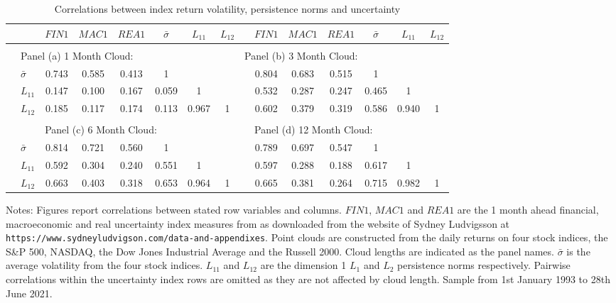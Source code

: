 \documentclass{article}
\begin{document}
\begin{table}
	\begin{center}
		\caption{Correlations between index return volatility, persistence norms and uncertainty}
		\label{tab:corunc}
		\begin{tabular}{l l c c c c c c c c c  c c c c}
			\hline
			&& $FIN1$ & $MAC1$ & $REA1$ & $\bar{\sigma}$ & $L_{11}$ & $L_{12}$ && $FIN1$ & $MAC1$ & $REA1$ & $\bar{\sigma}$ & $L_{11}$ & $L_{12}$\\
			\hline
			&&&&&&&&&&\\
			& \multicolumn{6}{l}{Panel (a) 1 Month Cloud:} && \multicolumn{6}{l}{Panel (b) 3 Month Cloud:}\\ &$\bar{\sigma}$ & 0.743&0.585&0.413&1&&&&0.804&0.683&0.515&1&&\\
			& $L_{11}$ & 0.147&0.100&0.167&0.059&1&&&0.532&0.287&0.247&0.465&1&\\
			&$L_{12}$&0.185&0.117&0.174&0.113&0.967&1&&0.602&0.379&0.319&0.586&0.940&1\\
			&&&&&\\
			&& \multicolumn{6}{l}{Panel (c) 6 Month Cloud:} && \multicolumn{6}{l}{Panel (d) 12 Month Cloud:}\\
			&$\bar{\sigma}$ &0.814&0.721&0.560&1&&&&0.789&0.697&0.547&1&&\\
			& $L_{11}$ & 0.592&0.304&0.240&0.551&1&&&0.597&0.288&0.188&0.617&1&\\
			& $L_{12}$&0.663&0.403&0.318&0.653&0.964&1&&0.665&0.381&0.264&0.715&0.982&1\\
			\hline
		\end{tabular}
	\end{center}
	\footnotesize{Notes: Figures report correlations between stated row variables and columns. $FIN1$, $MAC1$ and $REA1$ are the 1 month ahead financial, macroeconomic and real uncertainty index measures from \cite{jurado2015measuring} as downloaded from the website of Sydney Ludvigsson at \texttt{https://www.sydneyludvigson.com/data-and-appendixes}. Point clouds are constructed from the daily returns on four stock indices, the S\&P 500, NASDAQ, the Dow Jones Industrial Average and the Russell 2000. Cloud lengths are indicated as the panel names. $\bar{\sigma}$ is the average volatility from the four stock indices. $L_{11}$ and $L_{12}$ are the dimension 1 $L_1$ and $L_2$ persistence norms respectively. Pairwise correlations within the \cite{jurado2015measuring} uncertainty index rows are omitted as they are not affected by cloud length. Sample from 1st January 1993 to 28th June 2021.}  
\end{table}
\end{document}
